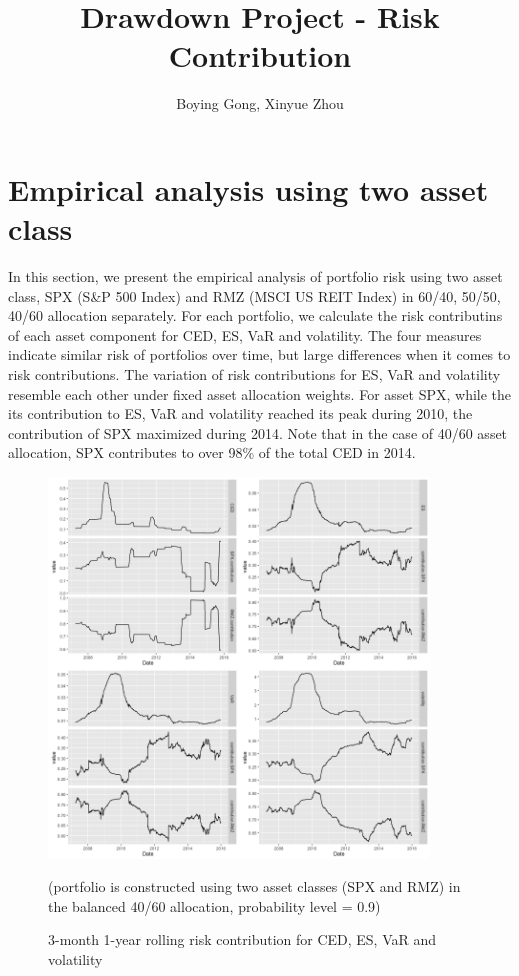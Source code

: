\documentclass[11pt]{article}
\title{Drawdown Project - Risk Contribution}
\author{Boying Gong, Xinyue Zhou}
\begin{document}
\maketitle

\tableofcontents

\clearpage

\section{Empirical analysis using two asset class}

In this section, we present the empirical analysis of portfolio risk using two asset class, SPX (S\&P 500 Index) and RMZ (MSCI US REIT Index) in 60/40, 50/50, 40/60 allocation separately. For each portfolio, we calculate the risk contributins of each asset component for CED, ES, VaR and volatility. The four measures indicate similar risk of portfolios over time, but large differences when it comes to risk contributions. The variation of risk contributions for ES, VaR and volatility resemble each other under fixed asset allocation weights. For asset SPX, while the its contribution to ES, VaR and volatility reached its peak during 2010, the contribution of SPX maximized during 2014. Note that in the case of 40/60 asset allocation, SPX contributes to over 98\% of the total CED in 2014. 

\begin{figure}[H]
\centering
\includegraphics[width = 0.9\textwidth]{../figures/risk_contribution/SPX_RMZ_46}
\caption{3-month 1-year rolling risk contribution for CED, ES, VaR and volatility}
(portfolio is constructed using two asset classes (SPX and RMZ) in the balanced 40/60 allocation, probability level = 0.9)
\label{fig:risk_contribution_SPX_RMZ_46}
\end{figure}
\end{document}
